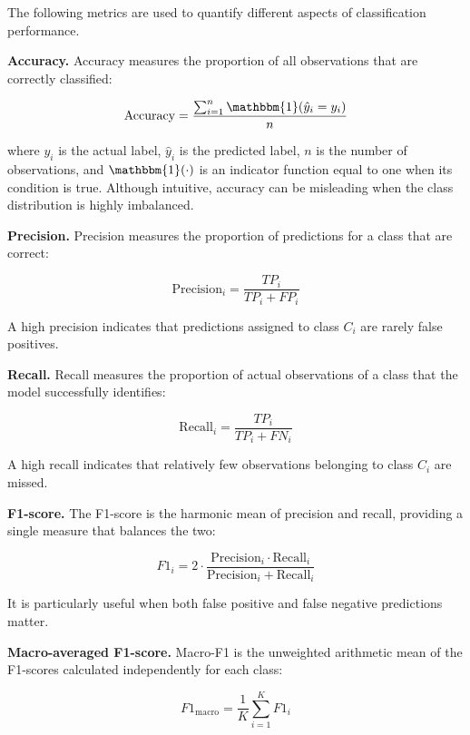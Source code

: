 The following metrics are used to quantify different aspects of classification performance.

\textbf{Accuracy.} Accuracy measures the proportion of all observations that are correctly classified:

\begin{equation}
\text{Accuracy} =
\frac{\sum_{i=1}^{n}\mathbbm{1}(\hat{y}_i=y_i)}{n}
\label{eq:accuracy}
\end{equation}

where $y_i$ is the actual label, $\hat{y}_i$ is the predicted label, $n$ is the number of observations, and $\mathbbm{1}(\cdot)$ is an indicator function equal to one when its condition is true. Although intuitive, accuracy can be misleading when the class distribution is highly imbalanced.

\textbf{Precision.} Precision measures the proportion of predictions for a class that are correct:

\begin{equation}
\text{Precision}_i =
\frac{TP_i}{TP_i+FP_i}
\label{eq:precision}
\end{equation}

A high precision indicates that predictions assigned to class $C_i$ are rarely false positives.

\textbf{Recall.} Recall measures the proportion of actual observations of a class that the model successfully identifies:

\begin{equation}
\text{Recall}_i =
\frac{TP_i}{TP_i+FN_i}
\label{eq:recall}
\end{equation}

A high recall indicates that relatively few observations belonging to class $C_i$ are missed.

\textbf{F1-score.} The F1-score is the harmonic mean of precision and recall, providing a single measure that balances the two:

\begin{equation}
F1_i =
2\cdot
\frac{\text{Precision}_i\cdot\text{Recall}_i}
{\text{Precision}_i+\text{Recall}_i}
\label{eq:f1}
\end{equation}

It is particularly useful when both false positive and false negative predictions matter.

\textbf{Macro-averaged F1-score.} Macro-F1 is the unweighted arithmetic mean of the F1-scores calculated independently for each class:

\begin{equation}
F1_{\text{macro}} =
\frac{1}{K}\sum_{i=1}^{K}F1_i
\label{eq:macro_f1}
\end{equation}

